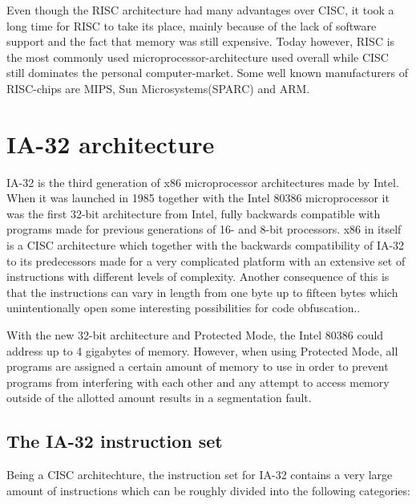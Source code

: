 \documentclass[11pt,twoside]{eitExjobb}
\begin{document}
\noindent Even though the RISC architecture had many advantages over CISC, it took a long time for RISC to take its place, mainly because of the lack of software support and the fact that memory was still expensive. Today however, RISC is the most commonly used microprocessor-architecture used overall while CISC still dominates the personal computer-market. Some well known manufacturers of RISC-chips are MIPS, Sun Microsystems(SPARC) and ARM.\cite{datorteknik}

\section{IA-32 architecture}
IA-32 is the third generation of  x86 microprocessor architectures made by Intel. When it was launched in 1985 together with the Intel 80386 microprocessor it was the first 32-bit architecture from Intel, fully backwards compatible with programs made for previous generations of 16- and 8-bit processors. x86 in itself is a CISC architecture which together with the backwards compatibility of IA-32 to its predecessors made for a very complicated platform with an extensive set of instructions with different levels of complexity. Another consequence of this is that the instructions can vary in length from one byte up to fifteen bytes which unintentionally open some interesting possibilities for code obfuscation.. 

With the new 32-bit architecture and Protected Mode, the Intel 80386 could address up to 4 gigabytes of memory. However, when using Protected Mode, all programs are assigned a certain amount of memory to use in order to prevent programs from interfering with each other and any attempt to access memory outside of the allotted amount results in a segmentation fault.

\subsection{The IA-32 instruction set}
Being a CISC architechture, the instruction set for IA-32 contains a very large amount of instructions which can be roughly divided into the following categories:\cite{x86quickguide}\cite{artofassembly} 
\end{document}
